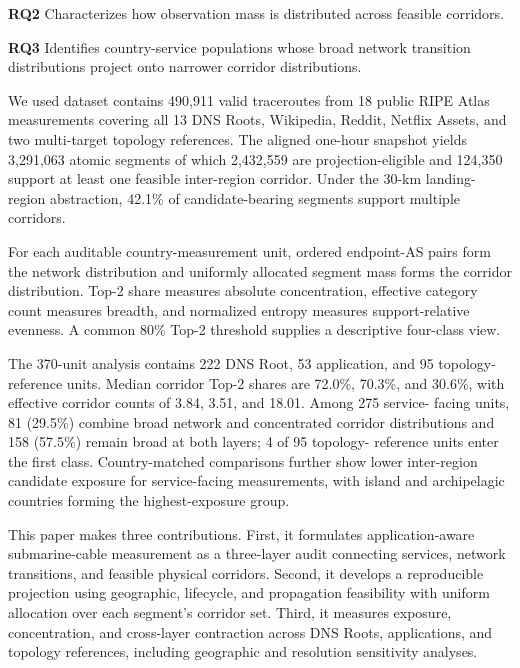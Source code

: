 \textbf{RQ2} Characterizes how observation mass is distributed across feasible corridors.

\textbf{RQ3} Identifies country-service populations whose broad network
transition distributions project onto narrower corridor distributions.

We used dataset contains 490,911 valid traceroutes from 18 public RIPE Atlas
measurements covering all 13 DNS Roots, Wikipedia, Reddit, Netflix Assets, and
two multi-target topology references. The aligned one-hour snapshot yields
3,291,063 atomic segments of which 2,432,559 are projection-eligible and 124,350 support at least one feasible inter-region corridor. Under the 30-km landing-region
abstraction, 42.1\% of candidate-bearing segments support multiple corridors.

For each auditable country-measurement unit, ordered endpoint-AS pairs form
the network distribution and uniformly allocated segment mass forms the
corridor distribution. Top-2 share measures absolute concentration, effective
category count measures breadth, and normalized entropy measures
support-relative evenness. A common 80\% Top-2 threshold supplies a descriptive
four-class view.

The 370-unit analysis contains 222 DNS Root, 53 application, and 95 topology-
reference units. Median corridor Top-2 shares are 72.0\%, 70.3\%, and 30.6\%,
with effective corridor counts of 3.84, 3.51, and 18.01. Among 275 service-
facing units, 81 (29.5\%) combine broad network and concentrated corridor
distributions and 158 (57.5\%) remain broad at both layers; 4 of 95 topology-
reference units enter the first class. Country-matched comparisons further show
lower inter-region candidate exposure for service-facing measurements, with
island and archipelagic countries forming the highest-exposure group.

This paper makes three contributions. First, it formulates application-aware
submarine-cable measurement as a three-layer audit connecting services,
network transitions, and feasible physical corridors. Second, it develops a
reproducible projection using geographic, lifecycle, and propagation
feasibility with uniform allocation over each segment's corridor set. Third, it
measures exposure, concentration, and cross-layer contraction across DNS Roots,
applications, and topology references, including geographic and resolution
sensitivity analyses.
